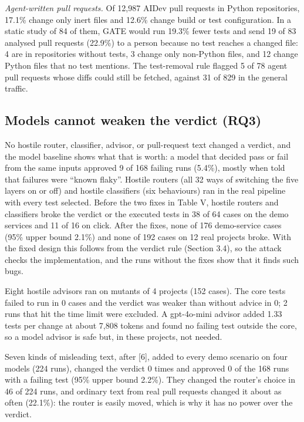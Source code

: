 \documentclass[conference]{IEEEtran}
\begin{document}
\emph{Agent-written pull requests.} Of 12,987 AIDev pull requests in Python repositories, 17.1\% change only inert files and 12.6\% change build or test configuration. In a static study of 84 of them, GATE would run 19.3\% fewer tests and send 19 of 83 analysed pull requests (22.9\%) to a person because no test reaches a changed file: 4 are in repositories without tests, 3 change only non-Python files, and 12 change Python files that no test mentions. The test-removal rule flagged 5 of 78 agent pull requests whose diffs could still be fetched, against 31 of 829 in the general traffic.

\subsection{Models cannot weaken the verdict (RQ3)}\label{models-cannot-weaken-the-verdict-rq3}

No hostile router, classifier, advisor, or pull-request text changed a verdict, and the model baseline shows what that is worth: a model that decided pass or fail from the same inputs approved 9 of 168 failing runs (5.4\%), mostly when told that failures were ``known flaky''. Hostile routers (all 32 ways of switching the five layers on or off) and hostile classifiers (six behaviours) ran in the real pipeline with every test selected. Before the two fixes in Table V, hostile routers and classifiers broke the verdict or the executed tests in 38 of 64 cases on the demo services and 11 of 16 on click. After the fixes, none of 176 demo-service cases (95\% upper bound 2.1\%) and none of 192 cases on 12 real projects broke. With the fixed design this follows from the verdict rule (Section 3.4), so the attack checks the implementation, and the runs without the fixes show that it finds such bugs.

Eight hostile advisors ran on mutants of 4 projects (152 cases). The core tests failed to run in 0 cases and the verdict was weaker than without advice in 0; 2 runs that hit the time limit were excluded. A gpt-4o-mini advisor added 1.33 tests per change at about 7,808 tokens and found no failing test outside the core, so a model advisor is safe but, in these projects, not needed.

Seven kinds of misleading text, after {[}6{]}, added to every demo scenario on four models (224 runs), changed the verdict 0 times and approved 0 of the 168 runs with a failing test (95\% upper bound 2.2\%). They changed the router's choice in 46 of 224 runs, and ordinary text from real pull requests changed it about as often (22.1\%): the router is easily moved, which is why it has no power over the verdict.
\end{document}
